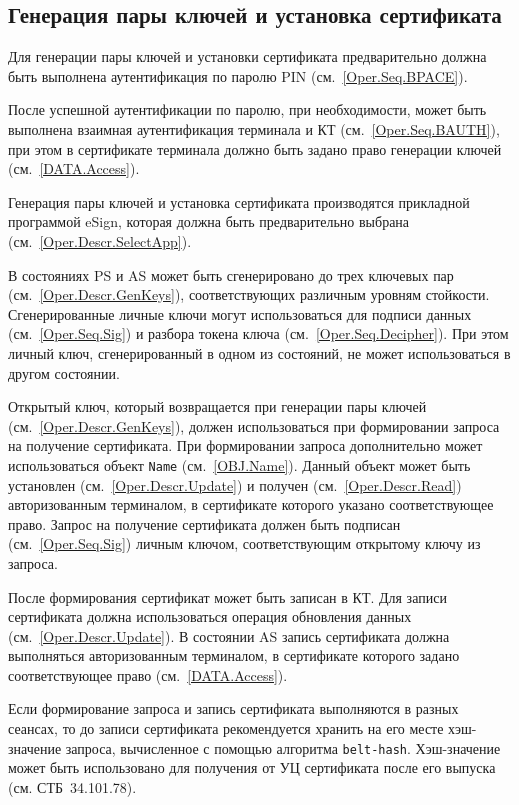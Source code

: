 \subsection{Генерация пары ключей и установка сертификата}
\label{Oper.Seq.GeKeySetCert}

Для генерации пары ключей и 
установки сертификата предварительно 
должна быть выполнена аутентификация по 
паролю PIN (см.~\ref{Oper.Seq.BPACE}).

После успешной аутентификации по паролю,
при необходимости, может быть выполнена взаимная 
аутентификация терминала и КТ (см.~\ref{Oper.Seq.BAUTH}),
при этом в сертификате терминала должно быть задано
право генерации ключей (см.~\ref{DATA.Access}).

Генерация пары ключей и установка сертификата производятся
прикладной программой eSign, которая должна быть предварительно 
выбрана (см.~\ref{Oper.Descr.SelectApp}). 

В состояниях PS и AS может быть сгенерировано
до трех ключевых пар (см.~\ref{Oper.Descr.GenKeys}), 
соответствующих различным уровням стойкости. 
Сгенерированные личные ключи могут использоваться
для подписи данных (см.~\ref{Oper.Seq.Sig}) и разбора токена 
ключа (см.~\ref{Oper.Seq.Decipher}).
При этом личный ключ, сгенерированный в одном из состояний, 
не может использоваться в другом состоянии. 

Открытый ключ, который возвращается при генерации пары ключей
(см.~\ref{Oper.Descr.GenKeys}), должен использоваться при формировании 
запроса на получение сертификата.
При формировании запроса дополнительно может использоваться 
объект \texttt{Name} (см.~\ref{OBJ.Name}). 
Данный объект может быть установлен (см.~\ref{Oper.Descr.Update}) 
и получен (см.~\ref{Oper.Descr.Read})
авторизованным терминалом, в сертификате которого указано 
соответствующее право.
\fi
Запрос на получение сертификата должен быть подписан (см.~\ref{Oper.Seq.Sig})
личным ключом, соответствующим открытому ключу из запроса.

После формирования сертификат может быть записан в КТ.
Для записи сертификата должна использоваться операция 
обновления данных (см.~\ref{Oper.Descr.Update}). 
В состоянии AS запись сертификата должна выполняться 
авторизованным терминалом, в сертификате которого задано 
соответствующее право (см.~\ref{DATA.Access}). 

Если формирование запроса и запись сертификата выполняются в разных сеансах, 
то до записи сертификата рекомендуется хранить на его месте 
хэш-значение запроса, вычисленное с помощью алгоритма \texttt{belt-hash}. 
%
Хэш-значение может быть использовано для получения от УЦ
сертификата после его выпуска (см. СТБ~34.101.78).

